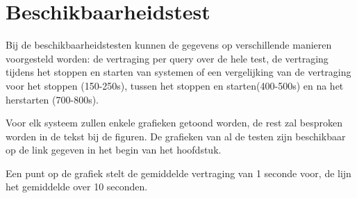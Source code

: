\FloatBarrier 
\section{Beschikbaarheidstest}
Bij de beschikbaarheidstesten kunnen de gegevens op verschillende manieren voorgesteld worden: de vertraging per query over de hele test, de vertraging tijdens het stoppen en starten van systemen of een vergelijking van de vertraging voor het stoppen (150-250s), tussen het stoppen en starten(400-500s) en na het herstarten (700-800s). 

Voor elk systeem zullen enkele grafieken getoond worden, de rest zal besproken worden in de tekst bij de figuren. De grafieken van al de testen zijn beschikbaar op de link gegeven in het begin van het hoofdstuk. 

Een punt op de grafiek stelt de gemiddelde vertraging van 1 seconde voor, de lijn het gemiddelde over 10 seconden. 


